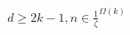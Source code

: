 \documentclass[preview]{standalone}
\begin{document}
\begin{align*}
d \geq 2k - 1, n \in \frac{1}{\zeta}^{\Omega(k)}
\end{align*}
\end{document}
